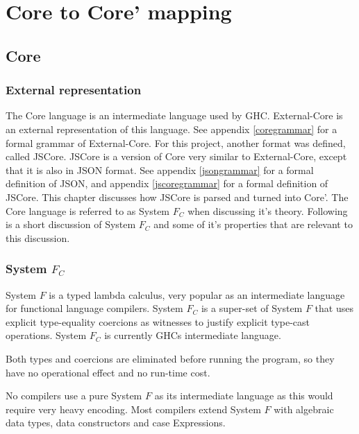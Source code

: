 

\chapter{Core to Core' mapping}
\label{chap:rewrite}


\section{Core}

\subsection{External representation}

The Core language is an intermediate language used by GHC. External-Core
is an external representation of this language. See appendix 
\ref{coregrammar} for a formal grammar of External-Core. For this project,
another format was defined, called JSCore. JSCore is a version of Core
very similar to External-Core, except that it is also in JSON format. 
See appendix \ref{jsongrammar} for a formal definition of JSON, and 
appendix \ref{jscoregrammar} for a formal definition of JSCore. This
chapter discusses how JSCore is parsed and turned into Core'. The Core
language is referred to as System $F_C$ when discussing it's theory.
Following is a short discussion of System $F_C$ and some of it's 
properties that are relevant to this discussion.


\subsection{System $F_C$}

System $F$ is a typed lambda calculus, very popular as an intermediate language
for functional language compilers. System $F_C$ is a super-set of System $F$ 
that uses explicit type-equality coercions as witnesses to justify explicit
type-cast operations. System $F_C$ is currently GHCs intermediate language.
\cite{sulzmann2007system}

Both types and coercions are eliminated before running the program, so they have
no operational effect and no run-time cost.
\cite{sulzmann2007system}

No compilers use a pure System $F$ as its intermediate language as this would
require very heavy encoding. Most compilers extend System $F$ with algebraic
data types, data constructors and case Expressions.
\cite{sulzmann2007system}

